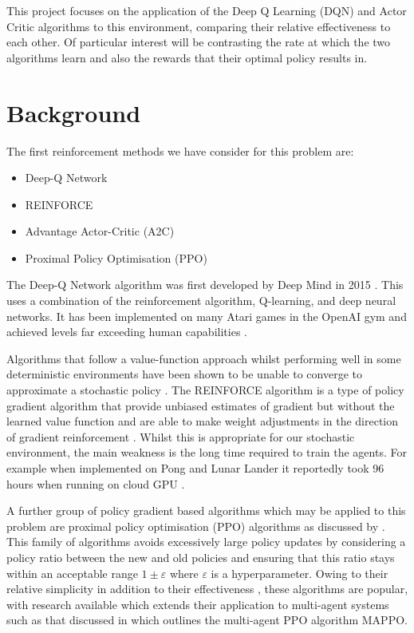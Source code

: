 \documentclass{article}
\begin{document}
This project focuses on the application of the Deep Q Learning (DQN) and Actor Critic algorithms to this environment, comparing their relative effectiveness to each other.
Of particular interest will be contrasting the rate at which the two algorithms learn and also the rewards that their optimal policy results in.

\section{Background} \label{Background}

The first reinforcement methods we have consider for this problem are:

\begin{itemize}
    \item Deep-Q Network
    \item REINFORCE
    \item Advantage Actor-Critic (A2C)
    \item Proximal Policy Optimisation (PPO)
\end{itemize}

The Deep-Q Network algorithm was first developed by Deep Mind in 2015 \citet{Mnih2015}.
This uses a combination of the reinforcement algorithm, Q-learning, and deep neural networks.
It has been implemented on many Atari games in the OpenAI gym and achieved levels far exceeding human capabilities \citet{Mnih2015}.

Algorithms that follow a value-function approach whilst performing well in some deterministic environments have been shown to be unable to converge to approximate a stochastic policy \citet{AdvanacesinNIPS}.
The REINFORCE algorithm is a type of policy gradient algorithm that provide unbiased estimates of gradient but without the learned value function and are able to make weight adjustments in the direction of gradient reinforcement \citet{Williams1992}.
Whilst this is appropriate for our stochastic environment, the main weakness is the long time required to train the agents. For example when implemented on Pong and Lunar Lander it reportedly took 96 hours when running on cloud GPU \citet{REINFORCE}.

A further group of policy gradient based algorithms which may be applied to this problem are proximal policy optimisation (PPO) algorithms as discussed by \citet{PPOAlgo}.
This family of algorithms avoids excessively large policy updates by considering a policy ratio between the new and old policies and ensuring that this ratio stays within an acceptable range $1\pm\varepsilon$ where $\varepsilon$ is a hyperparameter.
Owing to their relative simplicity in addition to their effectiveness \citet{PPOmultiagentgames}, these algorithms are popular, with research available which extends their application to multi-agent systems such as that discussed in \citet{PPOAlgo} which outlines the multi-agent PPO algorithm MAPPO.
\end{document}
